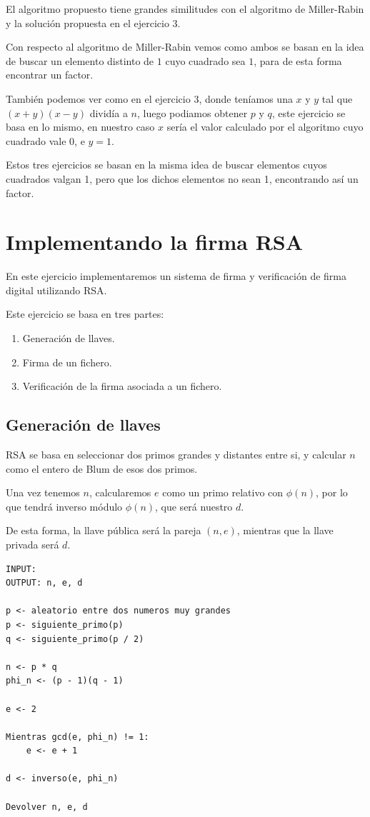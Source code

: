 \documentclass[12pt, spanish]{article}
\begin{document}
El algoritmo propuesto tiene grandes similitudes con el algoritmo de Miller-Rabin y la solución propuesta en el ejercicio 3.

Con respecto al algoritmo de Miller-Rabin vemos como ambos se basan en la idea de buscar un elemento distinto de $1$ cuyo cuadrado sea $1$, para de esta forma encontrar un factor.

También podemos ver como en el ejercicio 3, donde teníamos una $x$ y $y$  tal que $(x + y)(x - y)$ dividía a $n$, luego podiamos obtener $p$ y $q$, este ejercicio se basa en lo mismo, en nuestro caso $x$ sería el valor calculado por el algoritmo cuyo cuadrado vale 0, e $y = 1$.

Estos tres ejercicios se basan en la misma idea de buscar elementos cuyos cuadrados valgan 1, pero que los dichos elementos no sean 1, encontrando así un factor.


\section{Implementando la firma RSA}

En este ejercicio implementaremos un sistema de firma y verificación de firma digital utilizando RSA.

Este ejercicio se basa en tres partes:

\begin{enumerate}
	\item Generación de llaves.
	\item Firma de un fichero.
	\item Verificación de la firma asociada a un fichero.
\end{enumerate}

\subsection{Generación de llaves}

RSA se basa en seleccionar dos primos grandes y distantes entre si, y calcular $n$ como el entero de Blum de esos dos primos.

Una vez tenemos $n$, calcularemos $e$ como un primo relativo con $\phi(n)$, por lo que tendrá inverso módulo $\phi(n)$, que será nuestro $d$.

De esta forma, la llave pública será la pareja $(n, e)$, mientras que la llave privada será $d$.


\begin{lstlisting}[caption={Gnerar llaves RSA}]
INPUT:
OUTPUT: n, e, d

p <- aleatorio entre dos numeros muy grandes
p <- siguiente_primo(p)
q <- siguiente_primo(p / 2)

n <- p * q
phi_n <- (p - 1)(q - 1)

e <- 2

Mientras gcd(e, phi_n) != 1:
	e <- e + 1

d <- inverso(e, phi_n)

Devolver n, e, d
\end{lstlisting}
\end{document}
